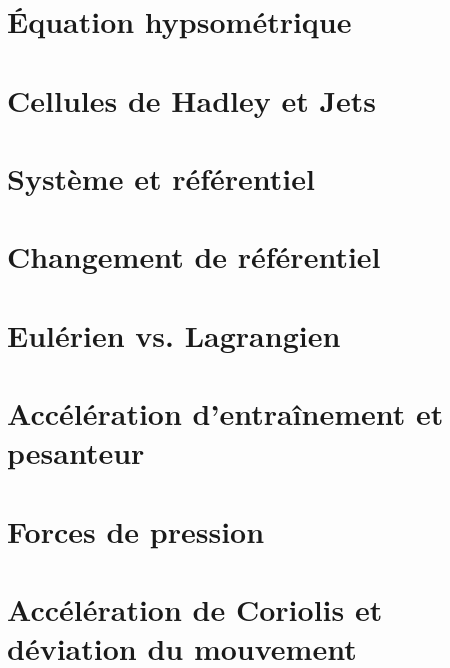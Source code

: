 \documentclass[a4paper,DIV16,10pt]{scrartcl}
\begin{document}
 \inidoc

\newpage
\section{\'Equation hypsométrique}


\newpage
\section{Cellules de Hadley et Jets}


\begin{detail} 
\newpage
\section{Système et référentiel}
	
\section{Changement de référentiel}
	
\section{Eulérien vs. Lagrangien}
	
\section{Accélération d'entraînement et pesanteur}
	
\section{Forces de pression}
	
\end{detail}


\newpage
\section{Accélération de Coriolis et déviation du mouvement}
	
\end{document}
